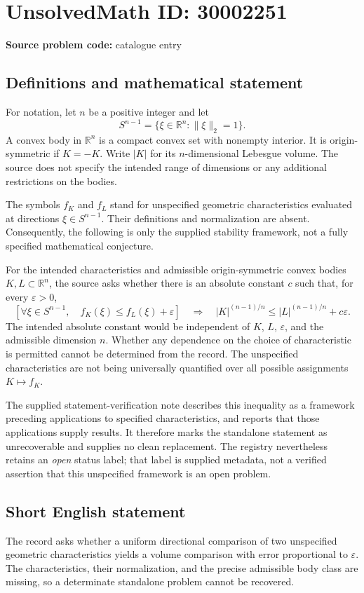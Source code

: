 \documentclass[11pt]{article}
\newcommand{\R}{\mathbb{R}}
\begin{document}
\section*{UnsolvedMath ID: 30002251}
\textbf{Source problem code:} catalogue entry
\subsection{Definitions and mathematical statement}
For notation, let \(n\) be a positive integer and let
\[
S^{n-1}=\{\xi\in\R^n:\|\xi\|_2=1\}.
\]
A convex body in \(\R^n\) is a compact convex set with nonempty interior. It is origin-symmetric if \(K=-K\). Write \(|K|\) for its \(n\)-dimensional Lebesgue volume. The source does not specify the intended range of dimensions or any additional restrictions on the bodies.

The symbols \(f_K\) and \(f_L\) stand for unspecified geometric characteristics evaluated at directions \(\xi\in S^{n-1}\). Their definitions and normalization are absent. Consequently, the following is only the supplied stability framework, not a fully specified mathematical conjecture.

For the intended characteristics and admissible origin-symmetric convex bodies \(K,L\subset\R^n\), the source asks whether there is an absolute constant \(c\) such that, for every \(\varepsilon>0\),
\[
\left[\forall\xi\in S^{n-1},\quad f_K(\xi)\leq f_L(\xi)+\varepsilon\right]
\quad\Longrightarrow\quad
|K|^{(n-1)/n}\leq |L|^{(n-1)/n}+c\varepsilon.
\]
The intended absolute constant would be independent of \(K\), \(L\), \(\varepsilon\), and the admissible dimension \(n\). Whether any dependence on the choice of characteristic is permitted cannot be determined from the record. The unspecified characteristics are not being universally quantified over all possible assignments \(K\mapsto f_K\).

The supplied statement-verification note describes this inequality as a framework preceding applications to specified characteristics, and reports that those applications supply results. It therefore marks the standalone statement as unrecoverable and supplies no clean replacement. The registry nevertheless retains an \emph{open} status label; that label is supplied metadata, not a verified assertion that this unspecified framework is an open problem.
\subsection{Short English statement}
The record asks whether a uniform directional comparison of two unspecified geometric characteristics yields a volume comparison with error proportional to \(\varepsilon\). The characteristics, their normalization, and the precise admissible body class are missing, so a determinate standalone problem cannot be recovered.
\end{document}
